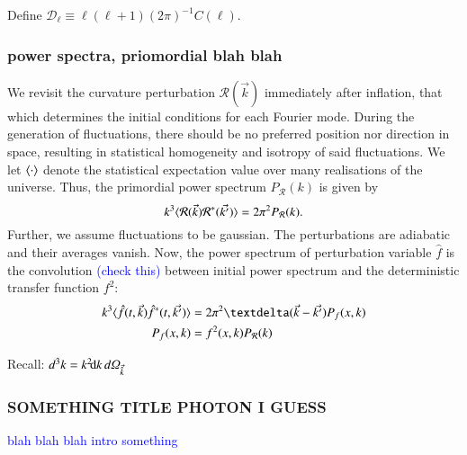 Define $\mathcal{D}_\ell \equiv \ell (\ell+1)(2\pi)^{-1} C(\ell) $.




\sendhelp


\subsubsection{power spectra, priomordial blah blah}
    We revisit the curvature perturbation $\mathcal{R}(\vec{k})$ immediately after inflation, that which determines the initial conditions for each Fourier mode. During the generation of fluctuations, there should be no preferred position nor direction in space, resulting in statistical homogeneity and isotropy of said fluctuations. We let $\avg{\cdot}$ denote the statistical expectation value over many realisations of the universe. Thus, the primordial power spectrum $P_\mathcal{R}(k)$ is given by
    \begin{equation}
        k^3 \avg{\mathcal{R}(\vec{k})\mathcal{R}^*(\vec{k'})} = 2\pi^2P_\mathcal{R}(k).
    \end{equation}
    Further, we assume fluctuations to be gaussian. The perturbations are adiabatic and their averages vanish. Now, the power spectrum of perturbation variable $\hat{f}$ is the convolution \textcolor{blue}{(check this)} between initial power spectrum and the deterministic transfer function $f^2$:
    \begin{equation}
    \begin{split}
        k^3\avg{ \hat{f}(t,\vec{k}) \hat{f}^\ast (t,\vec{k'})} &= 2\pi^2 \deltafunc{\vec{k}-\vec{k'}} P_f (x,k) \\
        P_f(x,k) &= f^2(x,k) P_\mathcal{R}(k)
    \end{split}
    \end{equation}



    Recall: $d^3k = k^2 \dx{k} \dOmg[k]$


\subsubsection{SOMETHING TITLE PHOTON I GUESS}
\textcolor{blue}{blah blah blah intro something}


